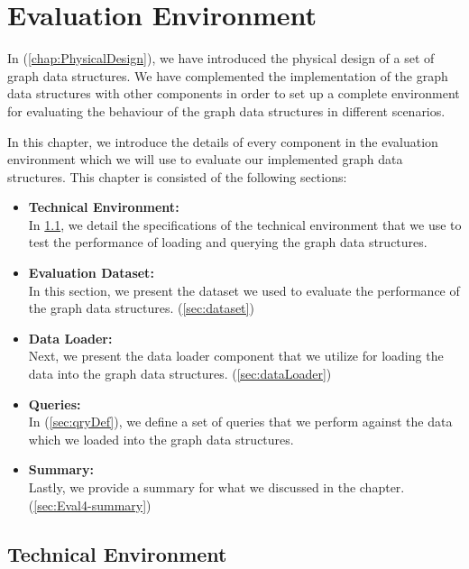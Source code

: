 {\chapter{Evaluation Environment}
\label{chap:Eval_4}

In (\ref{chap:PhysicalDesign}), we have introduced the physical design of a set of graph data structures. We have complemented the implementation of the graph data structures with other components in order to set up a complete environment for evaluating the behaviour of the graph data structures in different scenarios. 

In this chapter, we introduce the details of every component in the evaluation environment which we will use to evaluate our implemented graph data structures. This chapter is consisted of the following sections:

\begin{itemize}  

\item \textbf{Technical Environment:}\\
In \ref{sec:techEnv}, we detail the specifications of the technical environment that we use to test the performance of loading and querying the graph data structures. 

\item \textbf{Evaluation Dataset:}\\
In this section, we present the dataset we used to evaluate the performance of the graph data structures. (\ref{sec:dataset})

\item \textbf{Data Loader:}\\
Next, we present the data loader component that we utilize for loading the data into the graph data structures. (\ref{sec:dataLoader})

\item \textbf{Queries:}\\
In (\ref{sec:qryDef}), we define a set of queries that we perform against the data which we loaded into the graph data structures.

\item \textbf{Summary:}\\
Lastly, we provide a summary for what we discussed in the chapter. (\ref{sec:Eval4-summary})

\end{itemize}


\section{Technical Environment}
\label{sec:techEnv}

}
